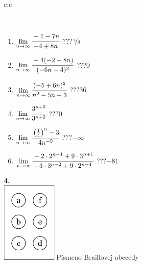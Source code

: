 \documentclass[10pt]{report}
\begin{document}
\begin{tabular}{c:c}
\begin{minipage}[c][104.5mm][t]{0.5\linewidth}
\begin{center}
\begin{minipage}{0.95\linewidth}
\begin{center}
\end{center}
\end{minipage}
\\[1mm]
\begin{minipage}{0.79\linewidth}
\begin{center}
\begin{varwidth}{\linewidth}
\begin{enumerate}
\normalsize
\item $\lim\limits_{n\to\infty}\cfrac{-1-7n}{-4+8n}$\quad \dotfill\; ???\;\dotfill \quad $\nicefrac{1}{4}$
\item $\lim\limits_{n\to\infty}\cfrac{-4(-2-8n)}{(-6n-4)^2}$\quad \dotfill\; ???\;\dotfill \quad $0$
\item $\lim\limits_{n\to\infty}\cfrac{(-5+6n)^2}{n^2-5n-3}$\quad \dotfill\; ???\;\dotfill \quad $36$
\item $\lim\limits_{n\to\infty}\cfrac{3^{n+3}}{3^{n+3}}$\quad \dotfill\; ???\;\dotfill \quad $0$
\item $\lim\limits_{n\to\infty}\cfrac{\left(\frac{1}{4}\right)^n -3}{4n^{-9}}$\quad \dotfill\; ???\;\dotfill \quad $-\infty$
\item $\lim\limits_{n\to\infty}\cfrac{-2\cdot 2^{n-1}+9\cdot 3^{n+1}}{-3\cdot 3^{n-2}+9\cdot 2^{n-1}}$\quad \dotfill\; ???\;\dotfill \quad $-81$
\end{enumerate}
\end{varwidth}
\end{center}
\end{minipage}
\begin{minipage}{0.20\linewidth}
\begin{center}
{\Huge\bfseries 4.} \\[2mm]
\includegraphics[height=40mm]{../images/braille.png}
{\small Písmeno Braillovej abecedy}
\end{center}
\end{minipage}
\end{center}
\end{minipage}
%
\end{tabular}
\newpage
\thispagestyle{empty}
\end{document}
